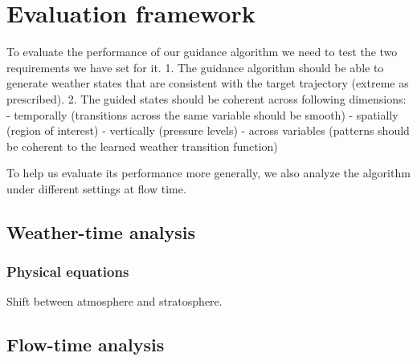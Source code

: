 \chapter{Evaluation framework}

To evaluate the performance of our guidance algorithm we need to test the two requirements we have set for it. 
1. The guidance algorithm should be able to generate weather states that are consistent with the target trajectory (extreme as prescribed).
2. The guided states should be coherent across following dimensions:
- temporally (transitions across the same variable should be smooth)
- spatially (region of interest)
- vertically (pressure levels)
- across variables (patterns should be coherent to the learned weather transition function)

To help us evaluate its performance more generally, we also analyze the algorithm under different settings at flow time.


\section{Weather-time analysis}

\subsection{Physical equations}

Shift between atmosphere and stratosphere.


\section{Flow-time analysis}